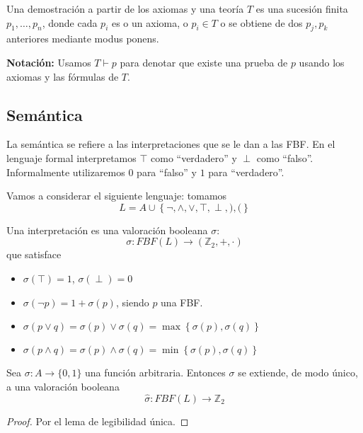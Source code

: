 \begin{defn}
	Una demostración a partir de los axiomas y una teoría $T$ es una sucesión finita $p_1, \hdots, p_n$, donde cada $p_i$ es o un axioma, o $p_i\in T$ o se obtiene de dos $p_j,p_k$ anteriores mediante modus ponens.
\end{defn}

\begin{mdframed}
\textbf{Notación: } Usamos $T\vdash p$ para denotar que existe una prueba de $p$ usando los axiomas y las fórmulas de $T$.
\end{mdframed}

\subsection{Semántica}
La semántica se refiere a las interpretaciones que se le dan a las FBF. En el lenguaje formal interpretamos $\top$ como ``verdadero'' y $\perp$ como ``falso''. Informalmente utilizaremos $0$ para ``falso'' y $1$ para ``verdadero''.

Vamos a considerar el siguiente lenguaje: tomamos $$L= A\cup \left\{\neg, \wedge, \vee, \top, \perp, ), ( \right\}$$

\begin{defn}[Interpretación]
Una interpretación es una valoración booleana $\sigma$: $$\sigma: FBF(L)\to (\mathbb{Z}_2, +, \cdot) $$
que satisface
\begin{itemize}
	\item $\sigma(\top) = 1$, $\sigma(\perp) = 0$
	\item $\sigma(\neg p) = 1+\sigma(p)$,  siendo $p$ una FBF.
	\item $\sigma (p\vee q) = \sigma(p) \vee \sigma (q) = \max\left\{\sigma(p), \sigma(q)\right\}$
	\item $\sigma (p\wedge q) = \sigma(p) \wedge \sigma (q) = \min\left\{\sigma(p), \sigma(q)\right\}$
\end{itemize}
\end{defn}

\begin{theorem}
	Sea $\sigma: A \to \{0, 1\}$ una función arbitraria. Entonces $\sigma$ se extiende, de modo único, a una valoración booleana $$\hat{\sigma}:FBF(L) \to \mathbb{Z}_2$$
\end{theorem}
\begin{proof}
	Por el lema de legibilidad única.
\end{proof}

